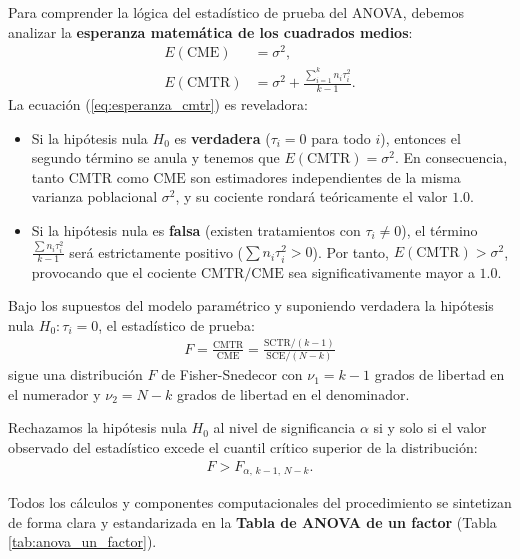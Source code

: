 Para comprender la lógica del estadístico de prueba del ANOVA, debemos analizar la \textbf{esperanza matemática de los cuadrados medios}:
\begin{align}
	E(\text{CME}) &= \sigma^2, \\
	E(\text{CMTR}) &= \sigma^2 + \frac{\sum_{i=1}^k n_i \tau_i^2}{k - 1}.
	\label{eq:esperanza_cmtr}
\end{align}
La ecuación (\ref{eq:esperanza_cmtr}) es reveladora:
\begin{itemize}
	\item Si la hipótesis nula $H_0$ es \textbf{verdadera} ($\tau_i = 0$ para todo $i$), entonces el segundo término se anula y tenemos que $E(\text{CMTR}) = \sigma^2$. En consecuencia, tanto $\text{CMTR}$ como $\text{CME}$ son estimadores independientes de la misma varianza poblacional $\sigma^2$, y su cociente rondará teóricamente el valor $1.0$.
	\item Si la hipótesis nula es \textbf{falsa} (existen tratamientos con $\tau_i \neq 0$), el término $\frac{\sum n_i \tau_i^2}{k-1}$ será estrictamente positivo ($\sum n_i \tau_i^2 > 0$). Por tanto, $E(\text{CMTR}) > \sigma^2$, provocando que el cociente $\text{CMTR} / \text{CME}$ sea significativamente mayor a $1.0$.
\end{itemize}

\begin{teorema}
	Bajo los supuestos del modelo paramétrico y suponiendo verdadera la hipótesis nula $H_0: \tau_i = 0$, el estadístico de prueba:
	\begin{align}
		F = \frac{\text{CMTR}}{\text{CME}} = \frac{\text{SCTR} / (k - 1)}{\text{SCE} / (N - k)}
	\end{align}
	sigue una distribución $F$ de Fisher-Snedecor con $\nu_1 = k - 1$ grados de libertad en el numerador y $\nu_2 = N - k$ grados de libertad en el denominador.
	
	Rechazamos la hipótesis nula $H_0$ al nivel de significancia $\alpha$ si y solo si el valor observado del estadístico excede el cuantil crítico superior de la distribución:
	\begin{align}
		F > F_{\alpha, \, k-1, \, N-k}.
	\end{align}
\end{teorema}

Todos los cálculos y componentes computacionales del procedimiento se sintetizan de forma clara y estandarizada en la \textbf{Tabla de ANOVA de un factor} (Tabla \ref{tab:anova_un_factor}).

